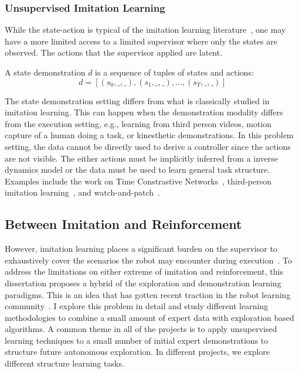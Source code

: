 \subsubsection{Unsupervised Imitation Learning}
While the state-action is typical of the imitation learning literature~\cite{osa2018algorithmic}, one may have a more limited access to a limited supervisor where only the states are observed. The actions that the supervisor applied are latent.

\begin{definition}
A state demonstration $d$ is a sequence of tuples of states and actions:
\[d = [(s_0,\_,\_),(s_1,\_,\_),...,(s_T,\_,\_)]\]
\end{definition}

The state demonstration setting differs from what is classically studied in imitation learning. 
This can happen when the demonstration modality differs from the execution setting, e.g., learning from third person videos, motion capture of a human doing a task, or kinesthetic demonstrations. 
In this problem setting, the data cannot be directly used to derive a controller since the actions are not visible.
The either actions must be implicitly inferred from a inverse dynamics model or the data must be used to learn general task structure.
Examples include the work on Time Constrastive Networks~\cite{sermanet2017time}, third-person imitation learning~\cite{stadie2017third}, and watch-and-patch~\cite{wu2018watch}.

\subsection*{Between Imitation and Reinforcement}
However, imitation learning places a significant burden on the supervisor to exhaustively cover the scenarios the robot may encounter during execution~\cite{laskey2017iterative}.
To address the limitations on either extreme of imitation and reinforcement, this dissertation proposes a hybrid of the exploration and demonstration learning paradigms. This is an idea that has gotten recent traction in the robot learning community~\cite{duan2017one, james2017transferring}. I explore this problem in detail and study different learning methodologies to combine a small amount of expert data with exploration based algorithms. A common theme in all of the projects is to apply unsupervised learning techniques to a small number of initial expert demonstrations to structure future autonomous exploration. In different projects, we explore different structure learning tasks.



